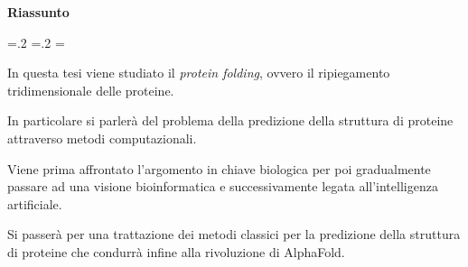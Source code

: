 	
	\vspace*{\fill}
	\begin{center}
		\textbf{\LARGE Riassunto}\newline\newline
	\end{center}
	\begin{list}{}{
			\leftmargin=.2\textwidth
			\rightmargin=.2\textwidth
			\listparindent=\parindent
			\itemsep=0pt
			\parsep=0pt}
		\item\relax
			In questa tesi viene studiato il \textit{protein folding}, ovvero il ripiegamento tridimensionale delle proteine. 
			\par In particolare si parlerà del problema della predizione della struttura di proteine attraverso metodi computazionali. 
			\par Viene prima affrontato l'argomento in chiave biologica per poi gradualmente passare ad una visione bioinformatica e successivamente legata all'intelligenza artificiale. 
			\par Si passerà per una trattazione dei metodi classici per la predizione della struttura di proteine che condurrà infine alla rivoluzione di AlphaFold.
		
	\end{list}
	\vfill %
	\clearpage



\clearpage